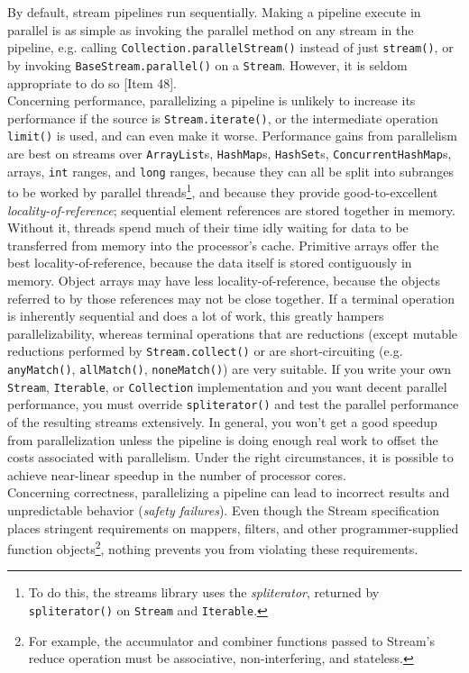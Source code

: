 \documentclass[8pt, table, xcdraw]{article}%
\begin{document}
By default, stream pipelines run sequentially. Making a pipeline execute in parallel is as simple as invoking the parallel method on any stream in the pipeline, e.g. calling \lstinline{Collection.parallelStream()} instead of just \lstinline{stream()}, or by invoking \lstinline{BaseStream.parallel()} on a \lstinline{Stream}. However, it is seldom appropriate to do so [Item 48].\\
Concerning performance, parallelizing a pipeline is unlikely to increase its performance if the source is \lstinline{Stream.iterate()}, or the intermediate operation \lstinline{limit()} is used, and can even make it worse. Performance gains from parallelism are best on streams over \lstinline{ArrayList}s, \lstinline{HashMap}s, \lstinline{HashSet}s, \lstinline{ConcurrentHashMap}s, arrays, \lstinline{int}
ranges, and \lstinline{long} ranges, because they can all be split into subranges to be worked by parallel threads\footnote{To do this, the streams library uses the \emph{spliterator}, returned by \lstinline{spliterator()} on \lstinline{Stream} and \lstinline{Iterable}.}, and because they provide good-to-excellent \emph{locality-of-reference}; sequential element references are stored together in memory. Without it, threads spend much of their time idly waiting for data to be transferred from memory into the processor’s cache. Primitive arrays offer the best locality-of-reference, because the data itself is stored contiguously in memory. Object arrays may have less locality-of-reference, because the objects referred to by those references may not be close together. If a terminal operation is inherently sequential and does a lot of work, this greatly hampers parallelizability, whereas terminal operations that are reductions (except mutable reductions performed by \lstinline{Stream.collect()} or are short-circuiting (e.g. \lstinline{anyMatch()}, \lstinline{allMatch()}, \lstinline{noneMatch()}) are very suitable. If you write your own \lstinline{Stream}, \lstinline{Iterable}, or \lstinline{Collection} implementation and you want decent parallel performance, you must override \lstinline{spliterator()} and test the parallel performance of the resulting streams extensively. In general, you won’t get a good speedup from parallelization unless the pipeline is doing enough real work to offset the costs associated with parallelism. Under the right circumstances, it is possible to
achieve near-linear speedup in the number of processor cores.\\
Concerning correctness, parallelizing a pipeline can lead to incorrect results and unpredictable behavior (\emph{safety failures}). Even though the Stream specification places stringent requirements on mappers, filters, and other programmer-supplied function objects\footnote{For example, the accumulator and combiner functions passed to Stream’s reduce operation must be associative, non-interfering, and stateless.}, nothing prevents you from violating these requirements.
\end{document}
